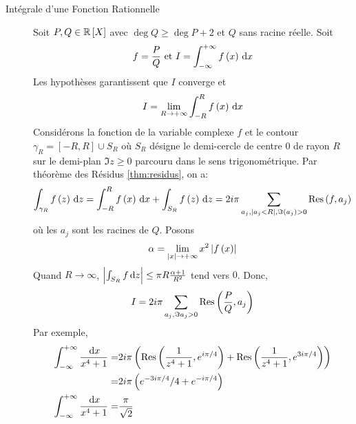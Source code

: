 \documentclass{cours}
\begin{document}
\begin{propositionfr}
\begin{description}
		\item[Intégrale d'une Fonction Rationnelle] Soit $P, Q \in \mathbb{R}\left[X\right]$ avec $\deg Q \geq \deg P + 2$ et $Q$ sans racine réelle. Soit 
			\begin{equation*}
				f = \frac{P}{Q} \text{ et } I = \int_{- \infty}^{+ \infty} f\left(x\right) {\rm \, d} x
			\end{equation*}
		Les hypothèses garantissent que $I$ converge et \begin{equation*}I = \lim_{R \to +\infty}\int_{- R}^{R}f\left(x\right) {\rm \, d} x\end{equation*}
		Considérons la fonction de la variable complexe $f$ et le contour $\gamma_{R} = \left[-R, R\right] \cup S_{R}$ où $S_{R}$ désigne le demi-cercle de centre $0$ de rayon $R$ sur le demi-plan $\Im z \geq 0$ parcouru dans le sens trigonométrique. 
		Par théorème des Résidus \ref{thm:residus}, on a:
		\begin{equation*}
			\int_{\gamma_{R}} f\left(z\right) {\rm \, d} z = \int_{- R}^{R} f\left(x\right) {\rm \, d} x + \int_{S_{R}} f\left(z\right) {\rm \, d} z = 2i\pi \sum_{a_{j}, \left|a_{j} < R\right|, \Im\left(a_{j}\right) > 0} \mathrm{Res}\left(f, a_{j}\right)
		\end{equation*}
		où les $a_{j}$ sont les racines de $Q$. Posons \begin{equation*}\alpha = \lim_{\left|x\right| \to + \infty} x^{2}\left|f\left(x\right)\right|\end{equation*}
		Quand $R \to \infty$, $\left|\int_{S_{R}}f {\rm \, d} z\right|\leq \pi R\frac{\alpha + 1}{R^{2}}$ tend vers $0$.
		Donc, 
		\begin{equation*}
			I = 2i\pi \sum_{a_{j}, \Im a_{j} > 0} \mathrm{Res}\left(\frac{P}{Q}, a_{j}\right)
		\end{equation*}
		Par exemple, 
		\begin{equation*}
			\begin{aligned}
				\int_{- \infty}^{+\infty}\frac{{\rm \, d} x}{x^{4} + 1} =& 2i\pi \left(\mathrm{Res}\left(\frac{1}{z^{4} + 1}, e^{i\pi/4}\right) + \mathrm{Res}\left(\frac{1}{z^{4} + 1}, e^{3i\pi/4}\right)\right)\\
				=& 2i\pi \left(e^{- 3i\pi/4}/4 + e^{-i\pi /4}\right)\\
				\int_{-\infty}^{+\infty}\frac{{\rm \, d} x}{x^{4}+1} =& \frac{\pi}{\sqrt{2}}
			\end{aligned}
		\end{equation*}
	\end{description}
\end{propositionfr}
\end{document}
